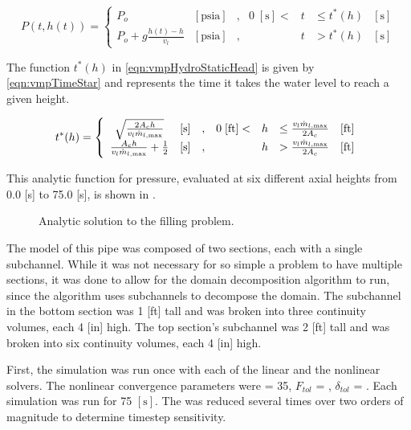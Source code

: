 \begin{equation}
\label{eqn:vmpHydroStaticHead}
P(t, h(t))= 
 \left\{
\begin{array}{cclrcll}
P_o & [ \text{psia} ] & , & 0\; [\text{s}] < & t & \leq t^{*}(h) & [\text{s}] \\
P_o + g \frac{ h(t) - h }{ v_{l} } & [ \text{psia} ] & , &  & t & > t^{*}(h) & [\text{s}]
\end{array}\right.
\end{equation}

The function $t^{*}(h)$ in \eqref{eqn:vmpHydroStaticHead} is given by \eqref{eqn:vmpTimeStar} and represents the time it takes the water level to reach a given height.

\begin{equation}
\label{eqn:vmpTimeStar}
t^{*}(h)= 
 \left\{
\begin{array}{cclrcll}
\sqrt{\frac{2 A_c h}{v_{l} \dot{m}_{l,\text{max}}}} & [ \text{s} ] & , & 0\; [ \text{ft}] < & h & \leq \frac{v_l \dot{m}_{l,\text{max}}}{2 A_c} & [\text{ft}] \\
\frac{ A_c h }{v_{l} \dot{m}_{l,\text{max}}} + \onehalf & [ \text{s} ] & , &                & h & > \frac{v_l \dot{m}_{l,\text{max}}}{2 A_c} & [\text{ft}]
\end{array}\right.
\end{equation}

This analytic function for pressure, evaluated at six different axial heights from 0.0 [s] to 75.0 [s], is shown in .

\begin{figure}[h!tb]
\centering

\caption{Analytic solution to the filling problem.}
\label{fig:vmpAnalyticSol}
\end{figure}

The model of this pipe was composed of two sections, each with a single subchannel.
While it was not necessary for so simple a problem to have multiple sections, it was done to allow for the domain decomposition algorithm to run, since the algorithm uses subchannels to decompose the domain.
The subchannel in the bottom section was 1 [ft] tall and was broken into three continuity volumes, each 4 [in] high.
The top section's subchannel was 2 [ft] tall and was broken into six continuity volumes, each 4 [in] high.

First, the simulation was run once with each of the linear and the nonlinear solvers.
The nonlinear convergence parameters were \kmax{} = 35, $F_{tol}$ = , $\delta_{tol}$ = . 
Each simulation was run for 75 $[ \text{s} ]$.
The \dtmax{} was reduced several times over two orders of magnitude to determine timestep sensitivity.

